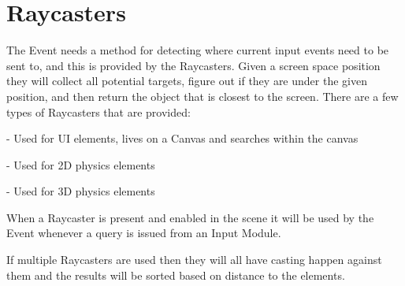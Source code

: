\chapter{Raycasters}
\hypertarget{md__hey_tea_9_2_library_2_package_cache_2com_8unity_8ugui_0d1_80_80_2_documentation_0i_2_raycasters}{}\label{md__hey_tea_9_2_library_2_package_cache_2com_8unity_8ugui_0d1_80_80_2_documentation_0i_2_raycasters}
\label{md__hey_tea_9_2_library_2_package_cache_2com_8unity_8ugui_0d1_80_80_2_documentation_0i_2_raycasters_autotoc_md4840}%
%
 The Event  needs a method for detecting where current input events need to be sent to, and this is provided by the Raycasters. Given a screen space position they will collect all potential targets, figure out if they are under the given position, and then return the object that is closest to the screen. There are a few types of Raycasters that are provided\+:


\begin{DoxyItemize}
\item {} -\/ Used for UI elements, lives on a Canvas and searches within the canvas
\item {} -\/ Used for 2D physics elements
\item {} -\/ Used for 3D physics elements
\end{DoxyItemize}

When a Raycaster is present and enabled in the scene it will be used by the Event  whenever a query is issued from an Input Module.

If multiple Raycasters are used then they will all have casting happen against them and the results will be sorted based on distance to the elements. 